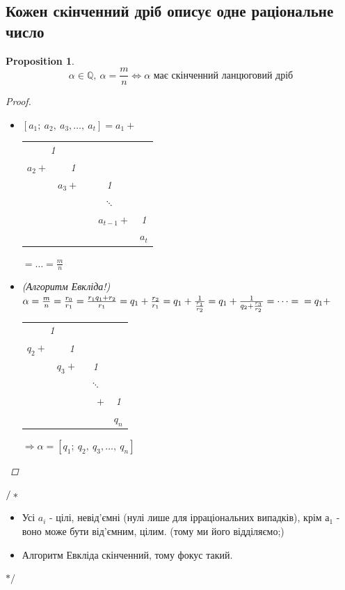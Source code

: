 \documentclass[a4paper,12pt, centered]{bookest}
\newtheorem*{prop*}{Proposition}
\begin{document}
\begin{appendices}
\section{Кожен скінченний дріб описує одне раціональне число}
\begin{prop*} $$\alpha\in\mathbb{Q},\>\alpha=\frac mn \Leftrightarrow\alpha \textrm{ має скінченний ланцюговий дріб}$$ 
	\begin{proof}$ $
		\begin{itemize}
			\item [$\Leftarrow$] $[a_1;\>a_2,\>a_3,\dots,\>a_t]=a_1+$
\begin{tabular}{ccccc}
\multicolumn{2}{c}{1}      &            &                 &       \\ \cline{1-2}
$a_2+$    & \multicolumn{2}{c}{1}       &                 &       \\ \cline{2-3}
          & $a_3+$         & \multicolumn{2}{c}{1}        &       \\ \cline{3-4}
          &                & \multicolumn{2}{c}{$\ddots$} &       \\
          &                &            & $a_{t-1}+$      & 1     \\ \cline{5-5} 
          &                &            &                 & $a_t$
\end{tabular} $=\dots=\frac mn$
			\item [$\Rightarrow$] (Алгоритм Евкліда!) $\\\alpha=\frac mn =\frac{r_0}{r_1}=\frac{r_1q_1+r_2}{r_1}=q_1+\frac{r_2}{r_1}=q_1+\frac1{\frac{r_1}{r_2}}=q_1+\frac1{q_2+\frac{r_3}{r_2}}=\dots=\\=q_1+$\begin{tabular}{ccccc}
\multicolumn{2}{c}{1}      &            &                 &       \\ \cline{1-2}
$q_2+$    & \multicolumn{2}{c}{1}       &                 &       \\ \cline{2-3}
          & $q_3+$         & \multicolumn{2}{c}{1}        &       \\ \cline{3-4}
          &                & \multicolumn{2}{c}{$\ddots$} &       \\
          &                &            & $+$      & 1     \\ \cline{5-5} 
          &                &            &                 & $q_n$
\end{tabular} $\Rightarrow\alpha=[q_1;\>q_2,\>q_3,\dots,\>q_n]$
		\end{itemize}
	\end{proof}
\end{prop*}
$\slash*\\$\begin{itemize}
	\item [$\Leftarrow$]Усі $a_i$ - цілі, невід'ємні (нулі лише для ірраціональних випадків), крім $а_1$ - воно може бути від'ємним, цілим. (тому ми його відділяємо;) 
	\item [$\Rightarrow$] Алгоритм Евкліда скінченний, тому фокус такий.
\end{itemize}
\begin{flushright}
$*\slash$
\end{flushright}

\end{appendices}
\end{document}
